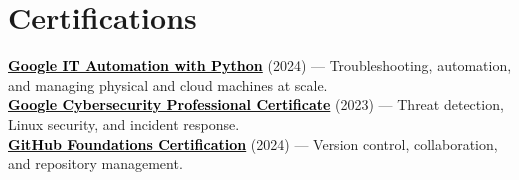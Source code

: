 \documentclass[a4paper]{article}
\begin{document}
\section{Certifications}
 \begin{itemize}[leftmargin=0.15in, label={}]
    \small{\item{
    \href{https://coursera.org/share/2afadc6ce043cc25337eb8c8fe61c9b6}{\textcolor{black}{\textbf{Google IT Automation with Python}}} (2024) --- Troubleshooting, automation, and managing physical and cloud machines at scale. \\
    \href{https://coursera.org/share/44fd8f381cb39ac45892569cdf6f7674}{\textcolor{black}{\textbf{Google Cybersecurity Professional Certificate}}} (2023) --- Threat detection, Linux security, and incident response. \\
    \href{https://www.credly.com/badges/d5c30c19-02db-4c5f-9bc9-4bd0f4b6a89e/public_url}{\textcolor{black}{\textbf{GitHub Foundations Certification}}} (2024) --- Version control, collaboration, and repository management.
    }}
 \end{itemize}


\end{document}
